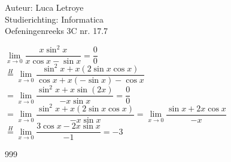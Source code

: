 \documentclass[a4paper]{article}
\begin{document}
  
\noindent \large Auteur: Luca Letroye        \\
\noindent \large Studierichting: Informatica \\
\noindent \large Oefeningenreeks 3C nr. 17.7 \\

\medskip

\normalsize

$ \lim\limits_{x \rightarrow 0} \dfrac{x\sin^2 x}{x\cos x - \sin x} = \dfrac{0}{0}$\\


$\overset{H}{=}  \lim\limits_{x \rightarrow 0} \dfrac{\sin^2 x + x(2\sin x\cos x)}{\cos x + x(-\sin x) - \cos x}  $\\

$= \lim\limits_{x \rightarrow 0} \dfrac{\sin^2 x + x\sin(2x)}{-x\sin x} = \dfrac{0}{0}  $\\

$= \lim\limits_{x \rightarrow 0} \dfrac{\sin^2 x + x(2\sin x \cos x)}{-x\sin x} = \lim\limits_{x \rightarrow 0} \dfrac{\sin x + 2x \cos x}{-x}  $\\

$\overset{H}{=} \lim\limits_{x \rightarrow 0} \dfrac{3\cos x -2x\sin x}{-1} = -3$\\





\begin{thebibliography}{999}
\end{thebibliography}
\end{document}
